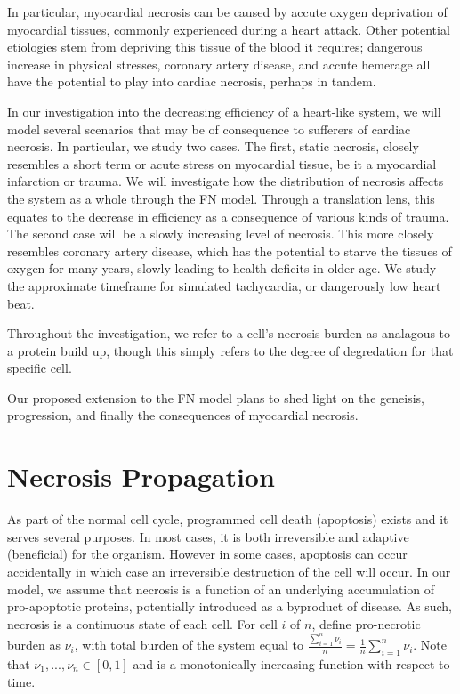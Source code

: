 \documentclass[11pt]{report}
\begin{document}
In particular, myocardial necrosis can be caused by accute oxygen deprivation of myocardial tissues, commonly experienced during a heart attack. Other potential etiologies stem from depriving this tissue of the blood it requires; dangerous increase in physical stresses, coronary artery disease, and accute hemerage all have the potential to play into cardiac necrosis, perhaps in tandem. 

In our investigation into the decreasing efficiency of a heart-like system, we will model several scenarios that may be of consequence to sufferers of cardiac necrosis. In particular, we study two cases. The first, static necrosis, closely resembles a short term or acute stress on myocardial tissue, be it a myocardial infarction or trauma. We will investigate how the distribution of necrosis affects the system as a whole through the FN model. Through a translation lens, this equates to the decrease in efficiency as a consequence of various kinds of trauma. The second case will be a slowly increasing level of necrosis. This more closely resembles coronary artery disease, which has the potential to starve the tissues of oxygen for many years, slowly leading to health deficits in older age. We study the approximate timeframe for simulated tachycardia, or dangerously low heart beat. 

Throughout the investigation, we refer to a cell's necrosis burden as analagous to a protein build up, though this simply refers to the degree of degredation for that specific cell.

Our proposed extension to the FN model plans to shed light on the geneisis, progression, and finally the consequences of myocardial necrosis. 

\section{Necrosis Propagation}

As part of the normal cell cycle, programmed cell death (apoptosis) exists and it serves several purposes. In most cases, it is both irreversible and adaptive (beneficial) for the organism. However in some cases, apoptosis can occur accidentally in which case an irreversible destruction of the cell will occur. In our model, we assume that necrosis is a function of an underlying accumulation of pro-apoptotic proteins, potentially introduced as a byproduct of disease. As such, necrosis is a continuous state of each cell. For cell $i$ of $n$, define pro-necrotic burden as $\nu_i$, with total burden of the system equal to $\frac{\sum^n_{i=1} \nu_i}{n}=\frac{1}{n} \sum^n_{i=1} \nu_i$. Note that $\nu_{1}, ..., \nu_{n} \in [0,1]$ and is a monotonically increasing function with respect to time. 
\end{document}
